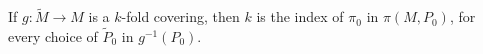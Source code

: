 If $g: \tilde{M} \rightarrow M$ is a $k$-fold covering, then $k$ is the index of $\pi_0$ in $\pi(M, P_0)$, for every choice of $\tilde{P}_0$ in $g^{-1}(P_0)$.
